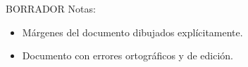 \thispagestyle{empty}
\begin{titlepage}
    \vspace*{\fill}
    \begin{center}
        {\crest} \\[1.3cm]
        {\Large \gradua}\\
        {\espezialitatea}\\[1.5cm]

        {\large {\gapizenburua}}\\[0.2cm]
        \HRule\\[0.5cm]

        {
        \LARGE
        \begin{spacing}{0.5}
        \textbf{\izenburua}
        \end{spacing}
        }
        \vspace{0.5cm}
        \HRule\\[2.0cm]

        {\egileatestua\\}
        {\textsl{\egilea}\\}
        \vspace{2.0cm}
        {\zuzendariaktestua\\}
        {\zuzendariak\\}
        \begin{tcolorbox}[breakable]
            BORRADOR\@
            Notas:
            \begin{itemize}
                \item Márgenes del documento dibujados explícitamente.
                \item Documento con errores ortográficos y de edición.
            \end{itemize}
        \end{tcolorbox}
    \end{center}
    \vspace*{\fill}
\end{titlepage}
\restoregeometry%
\cleardoublepage%

